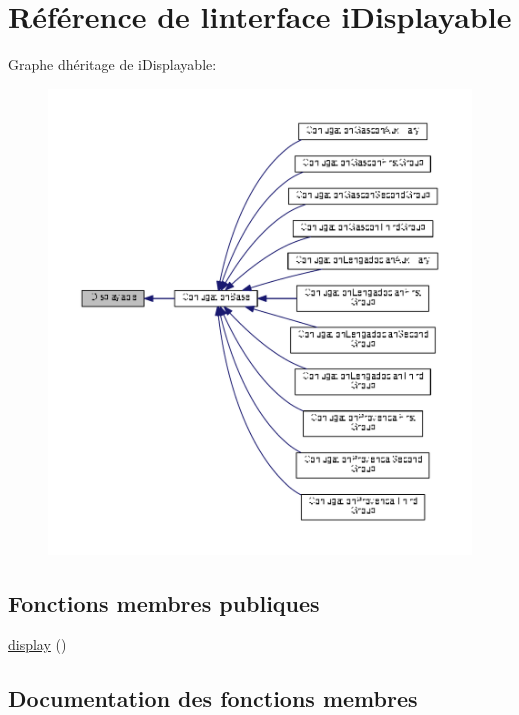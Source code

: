 \hypertarget{interfacei_displayable}{}\section{Référence de l\textquotesingle{}interface i\+Displayable}
\label{interfacei_displayable}


Graphe d\textquotesingle{}héritage de i\+Displayable\+:
\nopagebreak
\begin{figure}[H]
\begin{center}
\leavevmode
\includegraphics[width=350pt]{interfacei_displayable__inherit__graph}
\end{center}
\end{figure}
\subsection*{Fonctions membres publiques}
\begin{DoxyCompactItemize}
\item 
\hyperlink{interfacei_displayable_a0264fd455c876e897f754cf85f1681ca}{display} ()
\end{DoxyCompactItemize}


\subsection{Documentation des fonctions membres}
\hypertarget{interfacei_displayable_a0264fd455c876e897f754cf85f1681ca}{}\label{interfacei_displayable_a0264fd455c876e897f754cf85f1681ca} 

